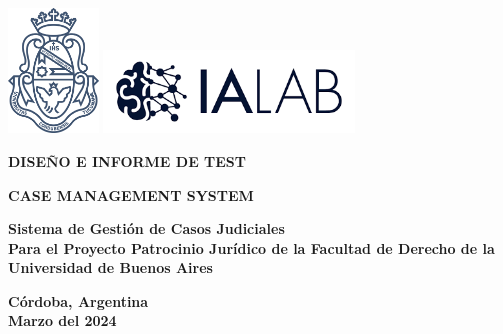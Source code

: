 \begin{center}

\includegraphics[width=0.18\textwidth]{fig/logoUNC.png}
\includegraphics[width=0.5\textwidth]{fig/ialab.png}

\vspace*{1cm}
\begin{large}
\textbf{DISEÑO E INFORME DE TEST}
\end{large}


\vspace*{0.1in}
\AddToShipoutPictureBG*{\AtPageLowerLeft{%
  \color{US_red!20}\rule{.25\paperwidth}{\paperheight}}}


\textbf{\huge CASE MANAGEMENT SYSTEM}

\vspace*{.5in}

{\Large \textbf{Sistema de Gestión de Casos Judiciales}}\\
{\Large \textbf{Para el Proyecto Patrocinio Jurídico de la Facultad de Derecho de la Universidad de Buenos Aires}}
        

\vspace*{4in}

\textbf{Córdoba, Argentina}\\
\textbf{Marzo del 2024}
\vspace*{0.2in}
\end{center}


\thispagestyle{empty} %
\clearpage\setcounter{page}{1} %
